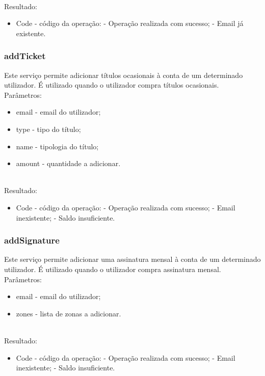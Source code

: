 ~\\Resultado:
\begin{itemize}
\item Code - código da operação:
 - Operação realizada com sucesso;
 - Email já existente.
\end{itemize}

\subsubsection{addTicket}

Este serviço permite adicionar títulos ocasionais à conta de um determinado utilizador. É utilizado quando o utilizador compra títulos ocasionais.
\newline
~\\Parâmetros:
\begin{itemize}
\item email - email do utilizador;
\item type - tipo do título;
\item name - tipologia do título;
\item amount - quantidade a adicionar.
\end{itemize}

~\\Resultado:
\begin{itemize}
\item Code - código da operação:
 - Operação realizada com sucesso;
 - Email inexistente;
 - Saldo insuficiente.
\end{itemize}

\subsubsection{addSignature}

Este serviço permite adicionar uma assinatura mensal à conta de um determinado utilizador. É utilizado quando o utilizador compra assinatura mensal.
\newline
~\\Parâmetros:
\begin{itemize}
\item email - email do utilizador;
\item zones - lista de zonas a adicionar.
\end{itemize}

~\\Resultado:
\begin{itemize}
\item Code - código da operação:
 - Operação realizada com sucesso;
 - Email inexistente;
 - Saldo insuficiente.
\end{itemize}


